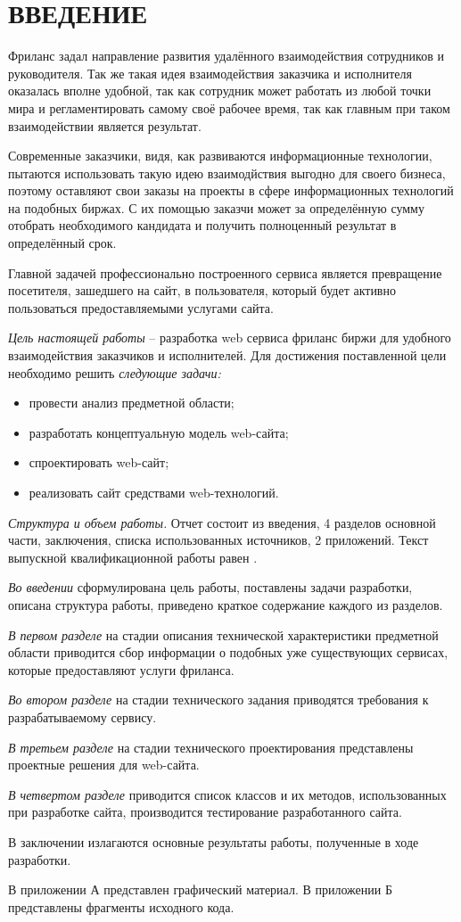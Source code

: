 \section*{ВВЕДЕНИЕ}

Фриланс задал направление развития удалённого взаимодействия сотрудников и руководителя. Так же такая идея взаимодействия заказчика и исполнителя оказалась вполне удобной, так как сотрудник может работать из любой точки мира и регламентировать самому своё рабочее время, так как главным при таком взаимодействии является результат. 

Современные заказчики, видя, как развиваются информационные технологии, пытаются использовать такую идею взаимодйствия выгодно для своего бизнеса, поэтому оставляют свои заказы на проекты в сфере информационных технологий на подобных биржах. С их помощью заказчи может за определённую сумму отобрать необходимого кандидата и получить полноценный результат в определённый срок.

Главной задачей профессионально построенного сервиса является превращение посетителя, зашедшего на сайт, в пользователя, который будет активно пользоваться предоставляемыми услугами сайта.

\emph{Цель настоящей работы} – разработка web сервиса фриланс биржи для удобного взаимодействия заказчиков и исполнителей. Для достижения поставленной цели необходимо решить \emph{следующие задачи:}
\begin{itemize}
\item провести анализ предметной области;
\item разработать концептуальную модель web-сайта;
\item спроектировать web-сайт;
\item реализовать сайт средствами web-технологий.
\end{itemize}

\emph{Структура и объем работы.} Отчет состоит из введения, 4 разделов основной части, заключения, списка использованных источников, 2 приложений. Текст выпускной квалификационной работы равен .

\emph{Во введении} сформулирована цель работы, поставлены задачи разработки, описана структура работы, приведено краткое содержание каждого из разделов.

\emph{В первом разделе} на стадии описания технической характеристики предметной области приводится сбор информации о подобных уже существующих сервисах, которые предоставляют услуги фриланса.

\emph{Во втором разделе} на стадии технического задания приводятся требования к разрабатываемому сервису.

\emph{В третьем разделе} на стадии технического проектирования представлены проектные решения для web-сайта.

\emph{В четвертом разделе} приводится список классов и их методов, использованных при разработке сайта, производится тестирование разработанного сайта.

В заключении излагаются основные результаты работы, полученные в ходе разработки.

В приложении А представлен графический материал.
В приложении Б представлены фрагменты исходного кода. 
